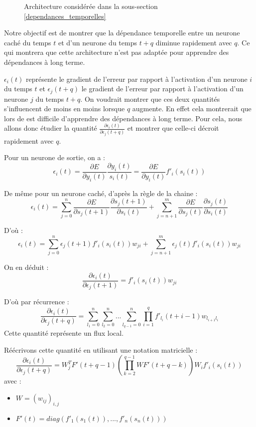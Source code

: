\begin{figure}
\begin{center}

\caption{Architecture considérée dans la sous-section \ref{dependances_temporelles}}
\label{archi_dep_tempo}
\end{center}
\end{figure}

Notre objectif est de montrer que la dépendance temporelle entre un neurone caché du temps $t$ et d'un neurone du temps $t + q$ diminue rapidement avec $q$. Ce qui montrera que cette architecture n'est pas adaptée pour apprendre des dépendances à long terme.

$\epsilon_i(t)$ représente le gradient de l'erreur par rapport à l'activation d'un neurone $i$ du temps $t$ et $\epsilon_j(t+q)$ le gradient de l'erreur par rapport à l'activation d'un neurone $j$ du temps $t+q$. On voudrait montrer que ces deux quantités s'influencent de moins en moins lorsque $q$ augmente. En effet cela montrerait que lors de est difficile d'apprendre des dépendances à long terme. Pour cela, nous allons donc étudier la quantité $\frac{\partial \epsilon_i(t)}{\partial \epsilon_j(t+q)}$ et montrer que celle-ci décroit rapidement avec $q$.

Pour un neurone de sortie, on a :
$$
\epsilon_i(t) = \frac{\partial E}{\partial y_i(t)}\frac{\partial y_i(t)}{s_i(t)} = \frac{\partial E}{\partial y_i(t)}f'_i(s_i(t))
$$

De même pour un neurone caché, d'après la règle de la chaine :
$$
\epsilon_i(t) = \sum_{j = 0}^{n}{\frac{\partial E}{\partial s_j(t+1)}\frac{\partial s_j(t+1)}{\partial s_i(t)}} + \sum_{j = n+1}^{m}{\frac{\partial E}{\partial s_j(t)}\frac{\partial s_j(t)}{\partial s_i(t)}}
$$

D'où :
$$
\epsilon_i(t) = \sum_{j = 0}^{n}{\epsilon_j(t+1)f'_i(s_i(t))w_{ji}} + \sum_{j = n+1}^{m}{\epsilon_j(t)f'_i(s_i(t))w_{ji}}
$$

On en déduit :
$$
\frac{\partial \epsilon_i(t)}{\partial \epsilon_j(t+1)} = f'_i(s_i(t))w_{ji}
$$

D'où par récurrence :
$$
\frac{\partial \epsilon_i(t)}{\partial \epsilon_j(t+q)} = \sum_{l_1 = 0}^{n}{\sum_{l_2 = 0}^{n}{...\sum_{l_{q-1} = 0}^{n}{\prod_{i=1}^{q}{f'_{l_i}(t+i-1)w_{l_{i+1}l_i}}}}}
$$
Cette quantité représente un flux local.

Réécrivons cette quantité en utilisant une notation matricielle :
$$
\frac{\partial \epsilon_i(t)}{\partial \epsilon_j(t+q)} = W_j^TF'(t + q - 1)(\prod_{k = 2}^{q-1}{WF'(t + q - k)})W_if'_i(s_i(t))
$$
avec : 
\begin{itemize}
\item $W = (w_{ij})_{i,j}$
\item $F'(t) = diag(f'_1(s_1(t)), ..., f'_n(s_n(t)))$
\end{itemize}

